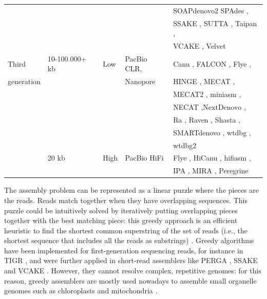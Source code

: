 \begin{table}
\begin{tabular}{|l|l|l|l|l|}
        &  &  &  & SOAPdenovo2 \cite{soapdenovo2} SPAdes \cite{spades}, \\
        &  &  &  & SSAKE \cite{ssake}, SUTTA \cite{sutta}, Taipan \cite{taipan}, \\
        &  &  &  & VCAKE \cite{vcake}, Velvet \cite{velvet} \\
    \hline
    Third & 10-100.000+ kb & Low & PacBio CLR, & Canu \cite{canu}, FALCON \cite{falcon-unzip}, Flye \cite{flye}, \\
    generation &  &  & Nanopore & HINGE \cite{hinge}, MECAT \cite{mecat}, \\
        &  &  &  & MECAT2 \cite{mecat}, miniasm \cite{miniasm}, \\
        &  &  &  & NECAT \cite{necat},NextDenovo \cite{nextdenovo}, \\
        &  &  &  & Ra \cite{ra}, Raven \cite{raven}, Shasta \cite{shasta}, \\
        &  &  &  & SMARTdenovo \cite{smartdenovo}, wtdbg \cite{wtdbg}, \\
        &  &  &  & wtdbg2 \cite{wtdbg2} \\
        & 20 kb & High & PacBio HiFi & Flye \cite{flye}, HiCanu \cite{hicanu}, hifiasm \cite{hifiasm}, \\ 
        &  &  &  & IPA \cite{IPA}, MIRA \cite{mira}, Peregrine \cite{peregrine}\\
    \hline
\end{tabular}
\label{tab:sequencing}
\end{table}


The assembly problem can be represented as a linear puzzle where the pieces are the reads. Reads match together when they have overlapping sequences. This puzzle could be intuitively solved by iteratively putting overlapping pieces together with the best matching piece: this greedy approach is an efficient heuristic to find the shortest common superstring of the set of reads (i.e., the shortest sequence that includes all the reads as substrings) \cite{greedy}. Greedy algorithms have been implemented for first-generation sequencing reads, for instance in TIGR \cite{tigr}, and were further applied in short-read assemblers like PERGA \cite{perga}, SSAKE \cite{ssake} and VCAKE \cite{vcake}. However, they cannot resolve complex, repetitive genomes: for this reason, greedy assemblers are mostly used nowadays to assemble small organelle genomes such as chloroplasts and mitochondria \cite{novoplasty}. \\

